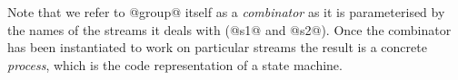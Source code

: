 Note that we refer to @group@ itself as a \emph{combinator} as it is parameterised by the names of the streams it deals with (@s1@ and @s2@). Once the combinator has been instantiated to work on particular streams the result is a concrete \emph{process}, which is the code representation of a state machine.







